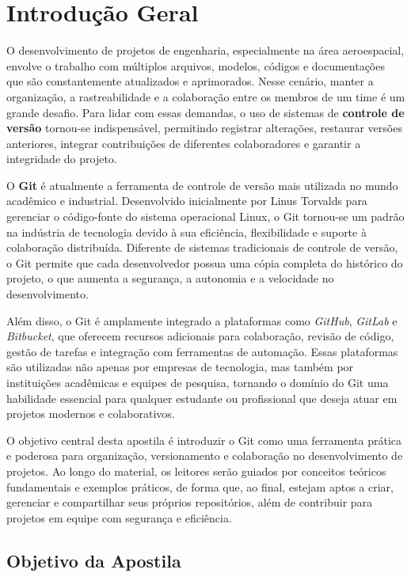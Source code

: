\section{Introdução Geral}

O desenvolvimento de projetos de engenharia, especialmente na área aeroespacial, envolve o trabalho com múltiplos arquivos, modelos, códigos e documentações que são constantemente atualizados e aprimorados. Nesse cenário, manter a organização, a rastreabilidade e a colaboração entre os membros de um time é um grande desafio. Para lidar com essas demandas, o uso de sistemas de \textbf{controle de versão} tornou-se indispensável, permitindo registrar alterações, restaurar versões anteriores, integrar contribuições de diferentes colaboradores e garantir a integridade do projeto.

O \textbf{Git} é atualmente a ferramenta de controle de versão mais utilizada no mundo acadêmico e industrial. Desenvolvido inicialmente por Linus Torvalds para gerenciar o código-fonte do sistema operacional Linux, o Git tornou-se um padrão na indústria de tecnologia devido à sua eficiência, flexibilidade e suporte à colaboração distribuída. Diferente de sistemas tradicionais de controle de versão, o Git permite que cada desenvolvedor possua uma cópia completa do histórico do projeto, o que aumenta a segurança, a autonomia e a velocidade no desenvolvimento.

Além disso, o Git é amplamente integrado a plataformas como \textit{GitHub}, \textit{GitLab} e \textit{Bitbucket}, que oferecem recursos adicionais para colaboração, revisão de código, gestão de tarefas e integração com ferramentas de automação. Essas plataformas são utilizadas não apenas por empresas de tecnologia, mas também por instituições acadêmicas e equipes de pesquisa, tornando o domínio do Git uma habilidade essencial para qualquer estudante ou profissional que deseja atuar em projetos modernos e colaborativos.

O objetivo central desta apostila é introduzir o Git como uma ferramenta prática e poderosa para organização, versionamento e colaboração no desenvolvimento de projetos. Ao longo do material, os leitores serão guiados por conceitos teóricos fundamentais e exemplos práticos, de forma que, ao final, estejam aptos a criar, gerenciar e compartilhar seus próprios repositórios, além de contribuir para projetos em equipe com segurança e eficiência.

\subsection{Objetivo da Apostila}

